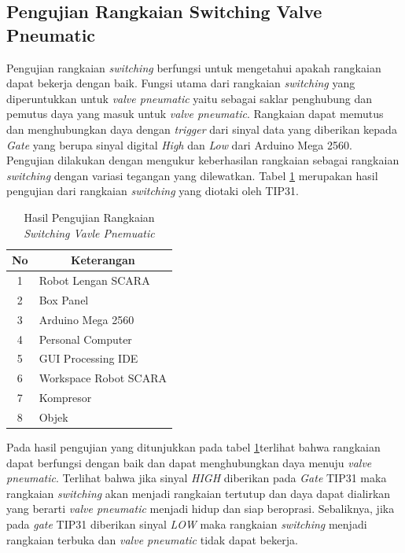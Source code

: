 \subsection{Pengujian Rangkaian Switching Valve Pneumatic}
Pengujian rangkaian \textit{switching} berfungsi untuk mengetahui apakah rangkaian dapat bekerja dengan baik. Fungsi utama dari rangkaian \textit{switching} yang diperuntukkan untuk \textit{valve pneumatic} yaitu sebagai saklar penghubung dan pemutus daya yang masuk untuk \textit{valve pneumatic}. Rangkaian dapat memutus dan menghubungkan daya dengan \textit{trigger} dari sinyal data yang diberikan kepada \textit{Gate} yang berupa sinyal digital \textit{High} dan \textit{Low} dari Arduino Mega 2560. Pengujian dilakukan dengan mengukur keberhasilan rangkaian sebagai rangkaian \textit{switching} dengan variasi tegangan yang dilewatkan. Tabel \ref{tbl.rangkaiantip} merupakan hasil pengujian dari rangkaian \textit{switching} yang diotaki oleh TIP31.
\begin{table}[H]
	\centering
	\caption{Hasil Pengujian Rangkaian \textit{Switching Vavle Pnemuatic}}
	\label{tbl.rangkaiantip}
	\begin{tabular}{|c|l|}
		\hline
		\rowcolor[HTML]{9B9B9B} 
		
		No & \multicolumn{1}{c|}{\cellcolor[HTML]{9B9B9B}Keterangan} \\ \hline
		1  & Robot Lengan SCARA                                      \\ \hline
		2  & Box Panel                                               \\ \hline
		3  & Arduino Mega 2560                                       \\ \hline
		4  & Personal Computer                                       \\ \hline
		5  & GUI Processing IDE                                      \\ \hline
		6  & Workspace Robot SCARA                                   \\ \hline
		7  & Kompresor                                               \\ \hline
		8  & Objek                                                   \\ \hline
	\end{tabular}
	
\end{table} 

Pada hasil pengujian yang ditunjukkan pada tabel \ref{tbl.rangkaiantip}terlihat bahwa rangkaian dapat berfungsi dengan baik dan dapat menghubungkan daya menuju \textit{valve pneumatic}. Terlihat bahwa jika sinyal \textit{HIGH} diberikan pada \textit{Gate} TIP31 maka rangkaian \textit{switching} akan menjadi rangkaian tertutup dan daya dapat dialirkan yang berarti \textit{valve pneumatic} menjadi hidup dan siap beroprasi. Sebaliknya, jika pada \textit{gate} TIP31 diberikan sinyal \textit{LOW} maka rangkaian \textit{switching} menjadi rangkaian terbuka dan \textit{valve pneumatic} tidak dapat bekerja.

